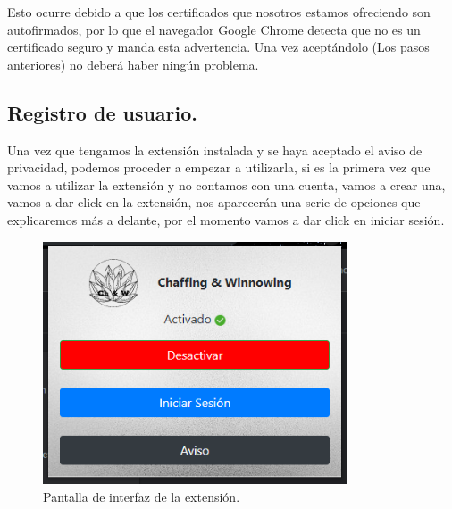 \documentclass[12pt, a4paper, titlepage]{report}
\begin{document}
    	Esto ocurre debido a que los certificados que nosotros estamos ofreciendo son autofirmados, por lo que el navegador Google Chrome detecta que no es un certificado seguro y manda esta advertencia. Una vez aceptándolo (Los pasos anteriores) no deberá haber ningún problema.
        
        \subsection{Registro de usuario.}
        Una vez que tengamos la extensión instalada y se haya aceptado el aviso de privacidad, podemos proceder a empezar a utilizarla, si es la primera vez que vamos a utilizar la extensión y no contamos con una cuenta, vamos a crear una, vamos a dar click en la extensión, nos aparecerán una serie de opciones que explicaremos más a delante, por el momento vamos a dar click en iniciar sesión.
        
        \begin{figure}[H]
    		\begin{center}	
    		\includegraphics[width=9cm]{./imagenes/Inicio_sesion/UI_extension.png}
    		\caption{Pantalla de interfaz de la extensión.}
    		\label{fig:UI_PantallaExtension}
    		\end{center}
    	\end{figure}
    	
\end{document}

